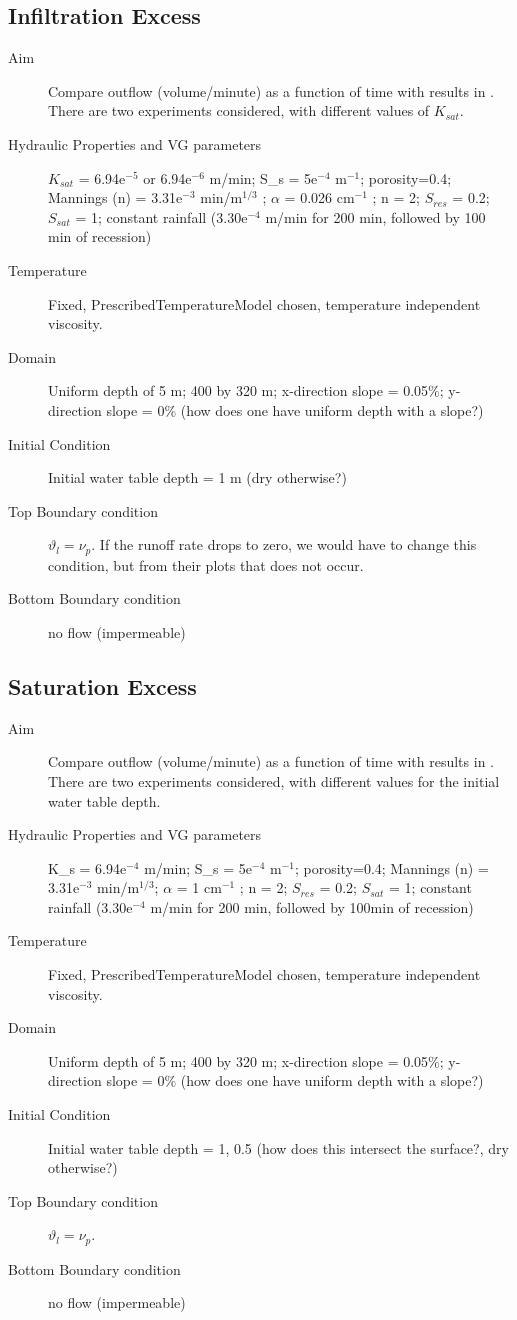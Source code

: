 \documentclass[twoside,10pt]{report}
\begin{document}
\subsection{Infiltration Excess}
\begin{description}
\item [Aim] Compare outflow (volume/minute) as a function of time with results in \citet{Maxwell14a}. There are two experiments considered, with different values of $K_{sat}$.
\item [Hydraulic Properties and VG parameters] $K_{sat}$ = 6.94e$^{-5}$ or 6.94e$^{-6}$ m/min; S_s = 5e$^{-4}$ m$^{-1}$; porosity=0.4; Mannings (n) = 3.31e$^{-3}$ min/m$^{1/3}$ ; $\alpha$  = 0.026 cm$^{-1}$ ; n = 2; $S_{res}$ = 0.2; $S_{sat}$ = 1; constant rainfall (3.30e$^{-4}$ m/min for 200 min, followed by 100 min of recession)
\item [Temperature] Fixed, PrescribedTemperatureModel chosen, temperature independent viscosity.
\item [Domain] Uniform depth of 5 m; 400 by 320 m; x-direction slope = 0.05$\%$; y-direction slope = 0$\%$ (how does one have uniform depth with a slope?)
\item [Initial Condition] Initial water table depth = 1 m (dry otherwise?)
\item [Top Boundary condition] $\vartheta_l = \nu_p$. If the runoff rate drops to zero, we would have to change this condition, but from their plots that does not occur.
\item [Bottom Boundary condition] no flow (impermeable)
\end{description}


\subsection{Saturation Excess}
\begin{description}
\item [Aim] Compare outflow (volume/minute) as a function of time with results in \citet{Maxwell14a}. There are two experiments considered, with different values for the initial water table depth.
\item [Hydraulic Properties and VG parameters] K_s = 6.94e$^{-4}$ m/min; S_s = 5e$^{-4}$ m$^{-1}$; porosity=0.4; Mannings (n) = 3.31e$^{-3}$ min/m$^{1/3}$; $\alpha$  = 1 cm$^{-1}$ ; n = 2; $S_{res}$ = 0.2; $S_{sat}$ = 1; constant rainfall (3.30e$^{-4}$ m/min for 200 min, followed by 100min of recession)
\item [Temperature] Fixed, PrescribedTemperatureModel chosen, temperature independent viscosity.
\item [Domain] Uniform depth of 5 m; 400 by 320 m; x-direction slope = 0.05$\%$; y-direction slope = 0$\%$ (how does one have uniform depth with a slope?)
\item [Initial Condition] Initial water table depth = 1, 0.5 (how does this intersect the surface?, dry otherwise?)
\item [Top Boundary condition] $\vartheta_l = \nu_p$.
\item [Bottom Boundary condition] no flow (impermeable)
\end{description}
\end{document}
